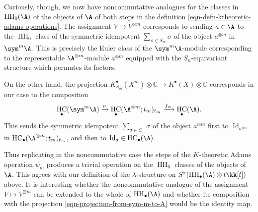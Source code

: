 \documentclass[12pt,a4paper,reqno]{amsart}
\DeclareMathOperator{\id}{Id}
\DeclareMathOperator{\hochhom}{{HH}}
\DeclareMathOperator{\hochcx}{{HC}}
\begin{document}
Curiously, though, we now have noncommutative analogues
for the classes in $\hochhom_0(\A)$ of the objects of $\A$
of both steps in the definition \eqref{eqn-defn-ktheoretic-adams-operations}.
The assignment $V \mapsto V^{\boxtimes m}$ 
corresponds to sending $a \in \A$ to the
$\hochhom_0$ class of the symmetric idempotent $\sum_{\sigma \in S_m}
\sigma$ of the object $a^{\otimes m}$ in $\sym^m \A$. 
This is precisely the Euler class of the $\sym^m \A$-module 
corresponding to the representable $\A^{\otimes m}$-module $a^{\otimes m}$
equipped with the $S_n$-equivariant structure which permutes its factors. 

On the other hand, the projection $K^\bullet_{S_m}(X^m) \otimes \mathbb{C}
\rightarrow K^\bullet(X) \otimes \mathbb{C}$ corresponds in our case to the composition 
\begin{align}
\label{eqn-projection-from-sym-m-to-A} 
\hochcx_\bullet(\sym^m \A) \xrightarrow{\nu}
\hochcx_\bullet(\A^{\otimes m};t_m)_{t_m} \xrightarrow{f_m}
\hochcx_\bullet(\A). 
\end{align}
This sends the symmetric idempotent 
$\sum_{\sigma \in S_m} \sigma$ of the object $a^{\otimes m}$ 
first to $\id_{a^{\otimes m}}$ in 
$\hochcx_\bullet(\A^{\otimes m};t_m)_{t_m}$, and then to 
$\id_a \in \hochcx_\bullet(\A)$. 

Thus replicating in the noncommutative case the steps
of the $K$-theoretic Adams operation $\psi_m$ produces
a trivial operation on the $\hochhom_0$ classes of the objects of $\A$. 
This agrees with our definition of the $\lambda$-structure on 
$S^*(\hochhom_\bullet(\A) \otimes t \kk[t])$ above. 
It is interesting whether the noncommutative analogue of 
the assignment $V \mapsto V^{\boxtimes m}$ can be extended to 
the whole of $\hochhom_\bullet(\A)$ and whether its composition 
with the projection \eqref{eqn-projection-from-sym-m-to-A} 
would be the identity map. 



\end{document}
